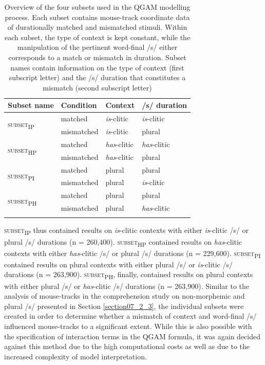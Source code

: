\begin{table}\fontsize{10}{11}
\caption{Overview of the four subsets used in the QGAM modelling process. Each subset contains mouse-track coordinate data of durationally matched and mismatched stimuli. Within each subset, the type of context is kept constant, while the manipulation of the pertinent word-final /s/ either corresponds to a match or mismatch in duration. Subset names contain information on the type of context (first subscript letter) and the /s/ duration that constitutes a mismatch (second subscript letter)}
\label{tab:8.4}
\centering
\begin{tabular}{llll} 
\lsptoprule
Subset name               & Condition  & Context             & /s/ duration           \\ 
\midrule
\multirow{2}{*}{\textsc{subset\textsubscript{IP}}} & matched    & \textit{is}-clitic  & \textit{is}-clitic   \\
                          & mismatched & \textit{is}-clitic  & plural               \\ 
\midrule
\multirow{2}{*}{\textsc{subset\textsubscript{HP}}} & matched    & \textit{has}-clitic & \textit{has}-clitic  \\
                          & mismatched & \textit{has}-clitic & plural               \\ 
\midrule
\multirow{2}{*}{\textsc{subset\textsubscript{PI}}} & matched    & plural              & plural               \\
                          & mismatched & plural              & \textit{is}-clitic   \\ 
\midrule
\multirow{2}{*}{\textsc{subset\textsubscript{PH}}} & matched    & plural              & plural               \\
                          & mismatched & plural              & \textit{has}-clitic  \\
\lspbottomrule
\end{tabular}
\end{table}

\textsc{subset\textsubscript{IP}} thus contained results on \textit{is}-clitic contexts with either \textit{is}-clitic /s/ or plural /s/ durations (n = 260,400). \textsc{subset\textsubscript{HP}} contained results on \textit{has}-clitic contexts with either \textit{has}-clitic /s/ or plural /s/ durations (n = 229,600). \textsc{subset\textsubscript{PI}} contained results on plural contexts with either plural /s/ or \textit{is}-clitic /s/ durations (n = 263,900). \textsc{subset\textsubscript{PH}}, finally, contained results on plural contexts with either plural /s/ or \textit{has}-clitic /s/ durations (n = 263,900). Similar to the analysis of mouse-tracks in the comprehension study on non-morphemic and plural /s/ presented in Section \ref{section07_2_3}, the individual subsets were created in order to determine whether a mismatch of context and word-final /s/ influenced mouse-tracks to a significant extent. While this is also possible with the specification of interaction terms in the QGAM formula, it was again decided against this method due to the high computational costs as well as due to the increased complexity of model interpretation. 

